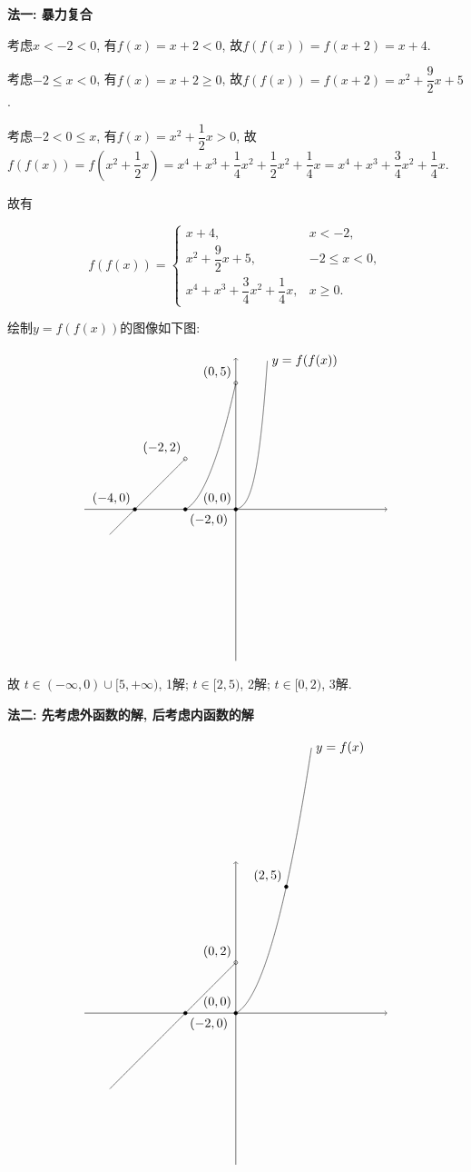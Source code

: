 \documentclass[8pt]{article}
\begin{document}
\begin{enumerate}[label=\arabic*.]
			\textbf{法一: 暴力复合}

			考虑$x<-2<0$, 有$f(x)=x+2<0$, 故$f(f(x))=f(x+2)=x+4$.

			考虑$-2\leq x<0$, 有$f(x)=x+2\geq 0$, 故$f(f(x))=f(x+2)=x^2+\dfrac{9}{2}x+5$.

			考虑$-2<0\leq x$, 有$f(x)=x^2+\dfrac{1}{2}x>0$, 故$f(f(x))=f\left(x^2+\dfrac{1}{2}x\right)=x^4 + x^3 + \dfrac{1}{4}x^2 + \dfrac{1}{2}x^2 + \dfrac{1}{4} x=x^4+x^3+\dfrac{3}{4}x^2+\dfrac{1}{4}x.$

			故有

			$$f(f(x))=\left\{\begin{array}{rl}x+4,&x<-2,\\x^2+\dfrac{9}{2}x+5,&-2\leq x<0,\\x^4+x^3+\dfrac{3}{4}x^2+\dfrac{1}{4}x,&x\geq 0.\end{array}\right.$$

			绘制$y=f(f(x))$的图像如下图:

			$$\begin{tikzpicture}[scale=0.7, baseline=0]
	    		\draw[black, ->] (-6,  0)--( 6,  0);
	    		\draw[black, ->] ( 0, -6)--( 0,  6);
	    		\draw[black, domain=-5:-2, samples=1000] plot(\x, {\x+4});
	    		\draw[black, domain=-2:0, samples=1000] plot(\x, {\x*\x+9/2*\x+5});
	    		\draw[black, domain=0:1.25, samples=1000] plot(\x, {\x*\x*\x*\x+\x*\x*\x+3/4*\x*\x+1/4*\x}) node[right] {$y=f(f(x))$};
	    		\filldraw[black] (-4, 0) circle (0.2em) node[anchor=south east] {$(-4, 0)$};
	    		\draw[black] (-2, 2) circle (0.2em) node[anchor=south east] {$(-2, 2)$};
	    		\filldraw[black] (-2, 0) circle (0.2em) node[anchor=north west] {$(-2, 0)$};
	    		\draw[black] (0, 5) circle (0.2em) node[anchor=south east] {$(0, 5)$};
	    		\filldraw[black] (0, 0) circle (0.2em) node[anchor=south east] {$(0, 0)$};
	    	\end{tikzpicture}
	    	$$

	    	故 $t\in(-\infty, 0)\cup[5, +\infty)$, 1解; $t\in[2, 5)$, 2解; $t\in[0, 2)$, 3解.

	    	\textbf{法二: 先考虑外函数的解, 后考虑内函数的解}

	    	$$\begin{tikzpicture}[scale=0.7, baseline=0]
	    		\draw[black, ->] (-6,  0)--( 6,  0);
	    		\draw[black, ->] ( 0, -6)--( 0,  6);
	    		\draw[black, domain=-5:0, samples=1000] plot(\x, {\x+2});
	    		\draw[black, domain=0:3, samples=1000] plot(\x, {\x*\x+1/2*\x}) node[right] {$y=f(x)$};
	    		\filldraw[black] (-2, 0) circle (0.2em) node[anchor=north west] {$(-2, 0)$};
	    		\draw[black] (0, 2) circle (0.2em) node[anchor=south east] {$(0, 2)$};
	    		\filldraw[black] (0, 0) circle (0.2em) node[anchor=south east] {$(0, 0)$};
	    		\filldraw[black] (2, 5) circle (0.2em) node[anchor=south east] {$(2, 5)$};
	    	\end{tikzpicture}
	    	$$


\end{enumerate}
\end{document}
